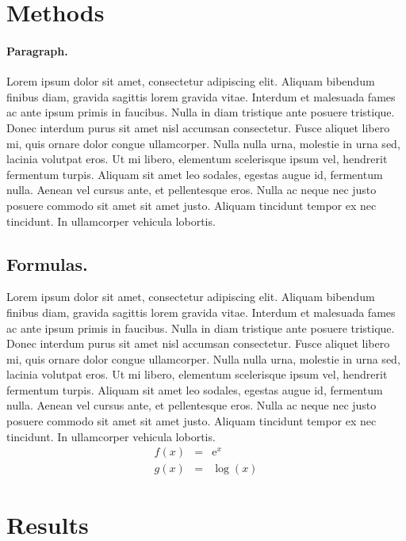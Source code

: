 \documentclass[10pt,letterpaper,twocolumn]{article}
\begin{document}
\section*{Methods}

\paragraph{Paragraph.}
Lorem ipsum dolor sit amet, consectetur adipiscing elit. Aliquam bibendum
finibus diam, gravida sagittis lorem gravida vitae. Interdum et malesuada fames
ac ante ipsum primis in faucibus. Nulla in diam tristique ante posuere
tristique. Donec interdum purus sit amet nisl accumsan consectetur. Fusce
aliquet libero mi, quis ornare dolor congue ullamcorper. Nulla nulla urna,
molestie in urna sed, lacinia volutpat eros. Ut mi libero, elementum scelerisque
ipsum vel, hendrerit fermentum turpis. Aliquam sit amet leo sodales, egestas
augue id, fermentum nulla. Aenean vel cursus ante, et pellentesque eros. Nulla
ac neque nec justo posuere commodo sit amet sit amet justo. Aliquam tincidunt
tempor ex nec tincidunt. In ullamcorper vehicula lobortis.

\subsection*{Formulas.}
Lorem ipsum dolor sit amet, consectetur adipiscing elit. Aliquam bibendum
finibus diam, gravida sagittis lorem gravida vitae. Interdum et malesuada fames
ac ante ipsum primis in faucibus. Nulla in diam tristique ante posuere
tristique. Donec interdum purus sit amet nisl accumsan consectetur. Fusce
aliquet libero mi, quis ornare dolor congue ullamcorper. Nulla nulla urna,
molestie in urna sed, lacinia volutpat eros. Ut mi libero, elementum scelerisque
ipsum vel, hendrerit fermentum turpis. Aliquam sit amet leo sodales, egestas
augue id, fermentum nulla. Aenean vel cursus ante, et pellentesque eros. Nulla
ac neque nec justo posuere commodo sit amet sit amet justo. Aliquam tincidunt
tempor ex nec tincidunt. In ullamcorper vehicula lobortis.
\begin{eqnarray}
    f(x) &=& \mathrm{e}^x \nonumber\\
    g(x) &=& \log(x)      \nonumber
\end{eqnarray}

\section*{Results}
\end{document}
